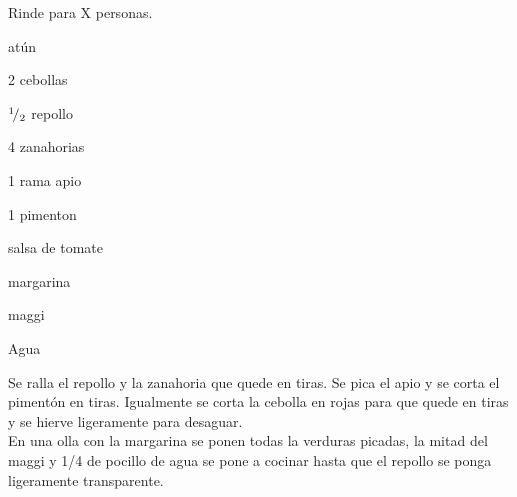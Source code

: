 
Rinde para X personas.

\begin{ingredientes}
\item atún
\item 2 cebollas
\item ${}^{1}\!/_{2}$ repollo
\item 4 zanahorias
\item 1 rama apio
\item 1 pimenton
\item salsa de tomate
\item margarina
\item maggi
\item Agua
\end{ingredientes}
\preparacion

Se ralla el repollo y la zanahoria que quede en tiras. Se pica el apio y se corta el pimentón en tiras. Igualmente se corta la cebolla en rojas para que quede en tiras y se hierve ligeramente para desaguar.\\

En una olla con la margarina se ponen todas la verduras picadas, la mitad del maggi y 1/4 de pocillo de agua se pone a cocinar hasta que el repollo se ponga ligeramente transparente.